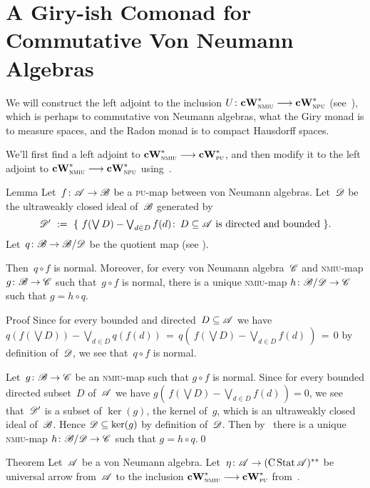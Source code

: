 \documentclass[main]{subfiles}
\begin{document}
\chapter{A Giry-ish Comonad for Commutative Von Neumann Algebras}


\begin{parsec}%
\begin{point}%
We will construct the left adjoint
to the inclusion $U\colon \mathbf{cW}^*_{\text{\textsc{nmiu}}}\longrightarrow \mathbf{cW}^*_{\text{\textsc{npu}}}$
(see~),
which 
is perhaps to commutative von Neumann algebras,
what the Giry monad is to  measure spaces,
and the Radon monad is to compact Hausdorff spaces.

We'll first find a left adjoint to $\mathbf{cW}^*_{\text{\textsc{nmiu}}}\longrightarrow \mathbf{cW}^*_{\text{\textsc{pu}}}$,
and then modify it
to the left adjoint to $\mathbf{cW}^*_{\text{\textsc{nmiu}}}\longrightarrow \mathbf{cW}^*_{\text{\textsc{npu}}}$
using~.
\end{point}
\begin{point}{Lemma}%
Let~$f\colon \mathscr{A}\to\mathscr{B}$
be a \textsc{pu}-map between
von Neumann algebras.
Let~$\mathscr{D}$ be the ultraweakly closed ideal of~$\mathscr{B}$
generated by
\begin{equation*}
\textstyle
\mathscr{D}' \ :=\ \{\ f(\bigvee D)-\bigvee_{d\in D}f(d)\colon \, 
D\subseteq \mathscr{A}\text{ is directed and bounded}\ \}.
\end{equation*}
Let~$q\colon \mathscr{B}\to \mathscr{B}/\mathscr{D}$ be the quotient
map (see ).

Then~$q\circ f$ is normal.
Moreover,
for every von Neumann algebra~$\mathscr{C}$
and \textsc{nmiu}-map $g\colon \mathscr{B}\to \mathscr{C}$
such that~$g\circ f$ is normal,
there is a unique \textsc{nmiu}-map $h\colon \mathscr{B}/\mathscr{D}\to \mathscr{C}$
such that $g=h \circ q$.
\begin{point}{Proof}%
Since for every bounded and directed~$D\subseteq \mathscr{A}$
we have
$q(f(\bigvee D)) - \bigvee_{d\in D}q(f(d))
\,=\, q(\ f(\bigvee D)-\bigvee_{d\in D}f(d)\ ) \,=\, 0$
by definition of~$\mathscr{D}$,
we see that~$q\circ f$ is normal.
\end{point}
\begin{point}%
Let~$g\colon \mathscr{B}\to \mathscr{C}$ be an \textsc{nmiu}-map
such that $g\circ f$ is normal.
Since for every bounded directed subset~$D$ of~$\mathscr{A}$
we have $g(\,f(\bigvee D)-\bigvee_{d\in D}f(d)\,)=0$,
we see that~$\mathscr{D}'$ is a subset of $\ker(g)$, the kernel of~$g$,
which is an ultraweakly closed ideal of~$\mathscr{B}$.
Hence $\mathscr{D}\subseteq \ker(g)$ by definition of~$\mathscr{D}$.
Then by~
there is a unique \textsc{nmiu}-map $h\colon \mathscr{B}/\mathscr{D}\to \mathscr{C}$
such that $g=h\circ q$.\qed
\end{point}
\end{point}
\begin{point}[cw-giry]{Theorem}%
Let~$\mathscr{A}$ be a von Neumann algebra.
Let~$\eta\colon\mathscr{A}\to (\operatorname{C}\operatorname{Stat}\mathscr{A})^{**}$
be universal arrow from~$\mathscr{A}$ to
the inclusion $\mathbf{cW}^*_{\text{\textsc{nmiu}}}\longrightarrow \mathbf{cW}^*_{\text{\textsc{pu}}}$
from~.


\end{point}
\end{parsec}
\end{document}
